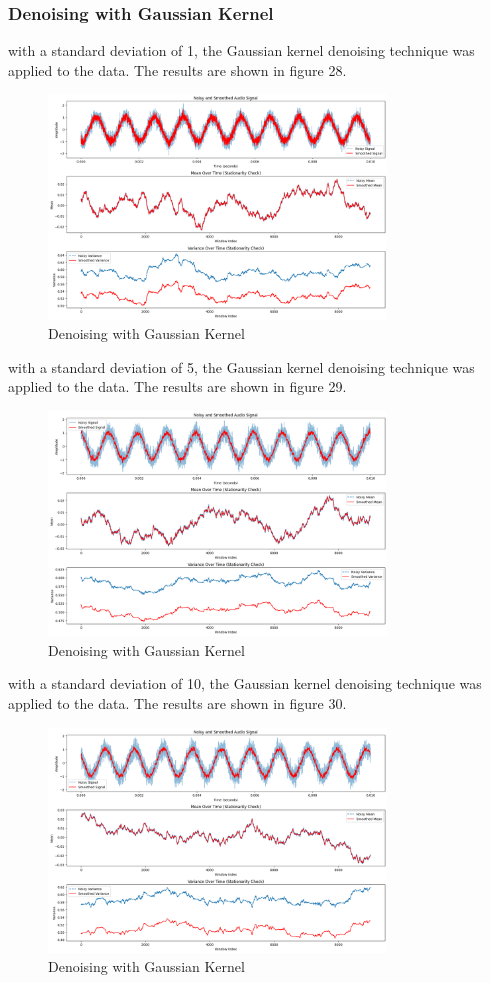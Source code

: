 \documentclass[a4paper,12pt]{article} %
\begin{document}
\subsubsection{ Denoising with Gaussian Kernel}
with a standard deviation of 1, the Gaussian kernel denoising technique was applied to the data. The results are shown in figure 28.
\begin{figure}[h]
\centering
\includegraphics[width=0.8\textwidth]{Q3_GK_1.png}
\caption{Denoising with Gaussian Kernel}
\end{figure}
\clearpage
with a standard deviation of 5, the Gaussian kernel denoising technique was applied to the data. The results are shown in figure 29.
\begin{figure}[h]
\centering
\includegraphics[width=0.8\textwidth]{Q3_GK_5.png}
\caption{Denoising with Gaussian Kernel}
\end{figure}
\clearpage
with a standard deviation of 10, the Gaussian kernel denoising technique was applied to the data. The results are shown in figure 30.
\begin{figure}[h]
\centering
\includegraphics[width=0.8\textwidth]{Q3_GK_10.png}
\caption{Denoising with Gaussian Kernel}
\end{figure}
\end{document}
